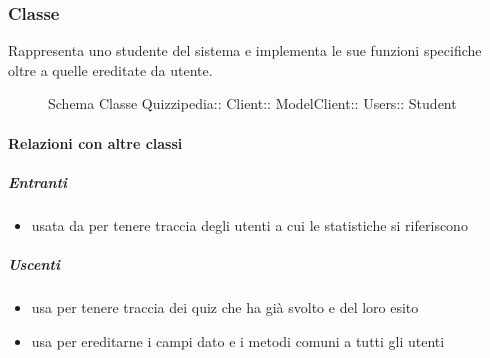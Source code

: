 \subsubsection{Classe }
Rappresenta uno studente del sistema e implementa le sue funzioni specifiche oltre a quelle ereditate da utente.
\begin{figure}[H]
\centering
\noindent{}
\caption[Schema Classe Student]{Schema Classe Quizzipedia:: Client:: ModelClient:: Users:: Student}
\end{figure}
\paragraph{Relazioni con altre classi}
\subparagraph{Entranti}
\begin{itemize}
\item usata da  per tenere traccia degli utenti a cui le statistiche si riferiscono
\end{itemize}
\subparagraph{Uscenti}
\begin{itemize}
\item usa  per tenere traccia dei quiz che ha già svolto e del loro esito
\item usa  per ereditarne i campi dato e i metodi comuni a tutti gli utenti
\end{itemize}
